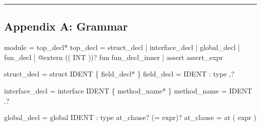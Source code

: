 \documentclass[
  11pt,
  a4paper,
]{report}
\newenvironment{Shaded}{\begin{snugshade}\small}{\end{snugshade}}
\newcommand{\NormalTok}[1]{#1}
\begin{document}
\begin{center}\rule{0.5\linewidth}{0.5pt}\end{center}

\subsection{Appendix A: Grammar}\label{appendix-a-grammar}

\begin{Shaded}
\begin{Highlighting}[]
\NormalTok{module      = top\_decl*}
\NormalTok{top\_decl    = struct\_decl}
\NormalTok{            | interface\_decl}
\NormalTok{            | global\_decl}
\NormalTok{            | fun\_decl}
\NormalTok{            | \textquotesingle{}@extern\textquotesingle{} (\textquotesingle{}(\textquotesingle{} INT \textquotesingle{})\textquotesingle{})? \textquotesingle{}fun\textquotesingle{} fun\_decl\_inner}
\NormalTok{            | \textquotesingle{}assert\textquotesingle{} assert\_expr}

\NormalTok{struct\_decl    = \textquotesingle{}struct\textquotesingle{} IDENT \textquotesingle{}\{\textquotesingle{} field\_decl* \textquotesingle{}\}\textquotesingle{}}
\NormalTok{field\_decl     = IDENT \textquotesingle{}:\textquotesingle{} type \textquotesingle{},\textquotesingle{}?}

\NormalTok{interface\_decl = \textquotesingle{}interface\textquotesingle{} IDENT \textquotesingle{}\{\textquotesingle{} method\_name* \textquotesingle{}\}\textquotesingle{}}
\NormalTok{method\_name    = IDENT \textquotesingle{},\textquotesingle{}?}

\NormalTok{global\_decl    = \textquotesingle{}global\textquotesingle{} IDENT \textquotesingle{}:\textquotesingle{} type at\_clause? (\textquotesingle{}=\textquotesingle{} expr)?}
\NormalTok{at\_clause      = \textquotesingle{}at\textquotesingle{} \textquotesingle{}(\textquotesingle{} expr \textquotesingle{})\textquotesingle{}}


\end{Highlighting}
\end{Shaded}
\end{document}
